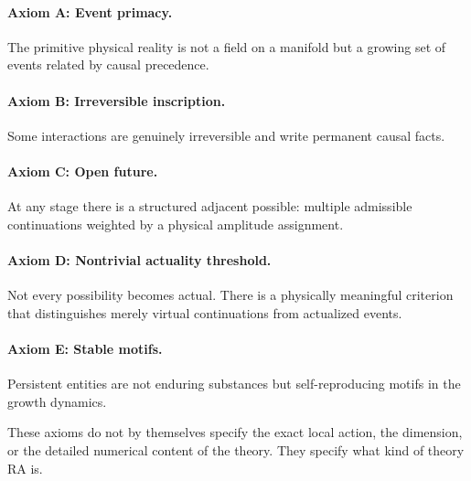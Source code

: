 \documentclass[11pt]{article}
\begin{document}
\paragraph{Axiom A: Event primacy.} The primitive physical reality is not a field on a manifold but a growing set of events related by causal precedence.

\paragraph{Axiom B: Irreversible inscription.} Some interactions are genuinely irreversible and write permanent causal facts.

\paragraph{Axiom C: Open future.} At any stage there is a structured adjacent possible: multiple admissible continuations weighted by a physical amplitude assignment.

\paragraph{Axiom D: Nontrivial actuality threshold.} Not every possibility becomes actual. There is a physically meaningful criterion that distinguishes merely virtual continuations from actualized events.

\paragraph{Axiom E: Stable motifs.} Persistent entities are not enduring substances but self-reproducing motifs in the growth dynamics.

These axioms do not by themselves specify the exact local action, the dimension, or the detailed numerical content of the theory. They specify what kind of theory RA is.
\end{document}

